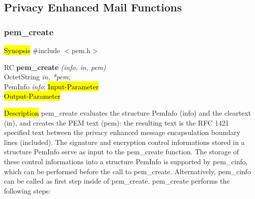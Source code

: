 \subsection{Privacy Enhanced Mail Functions} 

\subsubsection{pem\_create}
\label{pem_create}
\hl{Synopsis}
\#include $<$pem.h$>$ 

RC {\bf pem\_create} {\em (info, in, pem)} \\
OctetString {\em *in, *pem}; \\
PemInfo {\em *info};
\hl{Input-Parameter}
 \\
\hl{Output-Parameter}

\hl{Description}
pem\_create evaluates the structure PemInfo (info) and the cleartext (in),
and creates the PEM text (pem):
the resulting text is the RFC 1421 specified text between the
privacy enhanced message encapsulation boundary lines (included).
The signature and encryption control informations
stored in a structure PemInfo serve as input to the pem\_create function.
The storage of these control informations into a structure PemInfo
is supported by pem\_cinfo, which can be performed
before the call to pem\_create.
Alternatively, pem\_cinfo can be called as first step inside of
pem\_create.
pem\_create performs the following steps:

